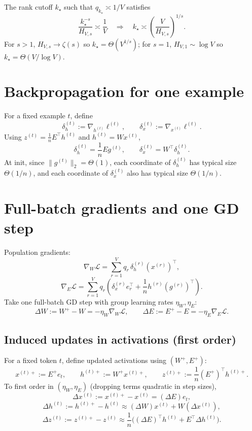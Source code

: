 \documentclass[11pt]{article}
\begin{document}
The rank cutoff $k_\star$ such that $q_{k_\star}\asymp 1/V$ satisfies
\[
\frac{k_\star^{-s}}{H_{V,s}} \asymp \frac{1}{V}
\quad \Longrightarrow \quad
k_\star \asymp \left(\frac{V}{H_{V,s}}\right)^{1/s}.
\]
For $s>1$, $H_{V,s}\to \zeta(s)$ so $k_\star=\Theta(V^{1/s})$; for $s=1$, $H_{V,1}\sim \log V$ so
$k_\star=\Theta(V/\log V)$.

\section{Backpropagation for one example}

For a fixed example $t$, define
\[
\delta_h^{(t)} := \nabla_{h^{(t)}}\ell^{(t)},\qquad
\delta_x^{(t)} := \nabla_{x^{(t)}}\ell^{(t)}.
\]
Using $z^{(t)}=\frac{1}{n}E^\top h^{(t)}$ and $h^{(t)}=Wx^{(t)}$,
\[
\delta_h^{(t)} = \frac{1}{n}E g^{(t)},\qquad
\delta_x^{(t)} = W^\top \delta_h^{(t)}.
\]
At init, since $\|g^{(t)}\|_2=\Theta(1)$, each coordinate of $\delta_h^{(t)}$ has typical size $\Theta(1/n)$,
and each coordinate of $\delta_x^{(t)}$ also has typical size $\Theta(1/n)$.

\section{Full-batch gradients and one GD step}

Population gradients:
\[
\nabla_W \mathcal{L} = \sum_{r=1}^V q_r\,\delta_h^{(r)} (x^{(r)})^\top,
\]
\[
\nabla_E \mathcal{L} = \sum_{r=1}^V q_r\left(\delta_x^{(r)} e_r^\top + \frac{1}{n}h^{(r)} (g^{(r)})^\top\right).
\]
Take one full-batch GD step with group learning rates $\eta_W,\eta_E$:
\[
\Delta W := W^+ - W = -\eta_W \nabla_W\mathcal{L},\qquad
\Delta E := E^+ - E = -\eta_E \nabla_E\mathcal{L}.
\]

\subsection{Induced updates in activations (first order)}
For a fixed token $t$, define updated activations using $(W^+,E^+)$:
\[
x^{(t)+} := E^+ e_t,\qquad h^{(t)+}:=W^+ x^{(t)+},\qquad z^{(t)+} := \frac{1}{n}(E^+)^\top h^{(t)+}.
\]
To first order in $(\eta_W,\eta_E)$ (dropping terms quadratic in step sizes),
\[
\Delta x^{(t)} := x^{(t)+}-x^{(t)} = (\Delta E)e_t,
\]
\[
\Delta h^{(t)} := h^{(t)+}-h^{(t)} \approx (\Delta W)x^{(t)} + W(\Delta x^{(t)}),
\]
\[
\Delta z^{(t)} := z^{(t)+}-z^{(t)} \approx \frac{1}{n}\Big((\Delta E)^\top h^{(t)} + E^\top \Delta h^{(t)}\Big).
\]
\end{document}

